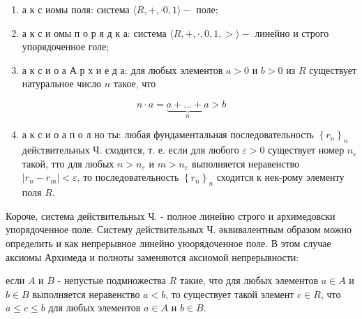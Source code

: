 \documentclass[10pt]{article}
\begin{document}
\begin{enumerate}

  \item а к с иомы поля: система $\langle R,+, \cdot 0,1\rangle-$ поле;



  \item а к с и омы п о р я д к а: система $\langle R,+, \cdot, 0,1,>\rangle-$ линейно и строго упорядоченное голе;



  \item а к с и о а А р х и е д а: для любых элементов $a>0$ и $b>0$ из $R$ существует натуральное число $n$ такое, что



\end{enumerate}



\[

n \cdot a=\underbrace{a+\ldots+a}_{n}>b

\]



\begin{enumerate}

  \setcounter{enumi}{3}

  \item а к с и о а п о л но ты: любая фундаментальная последовательность $\left\{r_{n}\right\}_{n}$ действительных Ч. сходится, т. е. если для любого $\varepsilon>0$ существует номер $n_{\varepsilon}$ такой, тто для любых $n>n_{\varepsilon}$ и $m>n_{\varepsilon}$ выполняется неравенство $\left|r_{n}-r_{m}\right|<\varepsilon$, то последовательность $\left\{r_{n}\right\}_{n}$ сходится к нек-рому элементу поля $R$.

\end{enumerate}



Короче, система действительных Ч. - полное линейно строго и архимедовски упорядоченное поле. Систему действительных Ч. әквивалентным образом можно определить и как непрерывное линейно уюорядоченное поле. В этом случае аксиомы Архимеда и полноты заменяются аксиомой непрерывности:



если $A$ и $B$ - непустые подмножества $R$ такие, что для любых элементов $a \in A$ и $b \in B$ выполняется неравенство $a<b$, то существует такой элемент $c \in R$, что $a \leqslant c \leqslant b$ для любых элементов $a \in A$ и $b \in B$.
\end{document}
